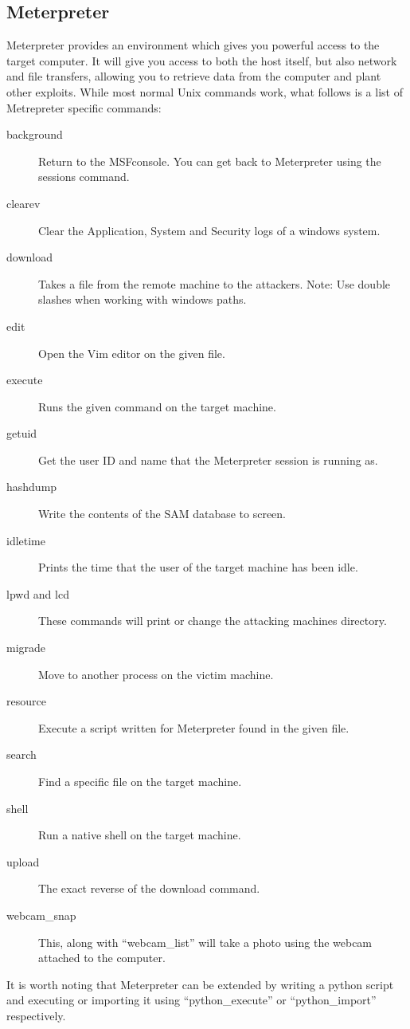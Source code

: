 \documentclass[a4paper,11pt]{report}
\begin{document}
			\subsection{Meterpreter}
				Meterpreter provides an environment which gives you powerful access to the target computer. 
				It will give you access to both the host itself, but also network and file transfers, allowing you to retrieve data from the computer and plant other exploits. 
				While most normal Unix commands work, what follows is a list of Metrepreter specific commands:
				\begin{description}
					\item[background]
						Return to the MSFconsole. 
						You can get back to Meterpreter using the sessions command. 
					\item[clearev]
						Clear the Application, System and Security logs of a windows system. 
					\item[download] 
						Takes a file from the remote machine to the attackers. 
						Note: Use double slashes when working with windows paths. 
					\item[edit] 
						Open the Vim editor on the given file. 
					\item[execute]
						Runs the given command on the target machine. 
					\item[getuid]
						Get the user ID and name that the Meterpreter session is running as. 
					\item[hashdump]
						Write the contents of the SAM database to screen. 
					\item[idletime]
						Prints the time that the user of the target machine has been idle. 
					\item[lpwd and lcd]
						These commands will print or change the attacking machines directory. 
					\item[migrade]
						Move to another process on the victim machine. 
					\item[resource]
						Execute a script written for Meterpreter found in the given file. 
					\item[search]
						Find a specific file on the target machine. 
					\item[shell]
						Run a native shell on the target machine. 
					\item[upload]
						The exact reverse of the download command. 
					\item[webcam\_snap]
						This, along with ``webcam\_list'' will take a photo using the webcam attached to the computer. 
				\end{description}
				It is worth noting that Meterpreter can be extended by writing a python script and executing or importing it using ``python\_execute'' or ``python\_import'' respectively. 
\end{document}
